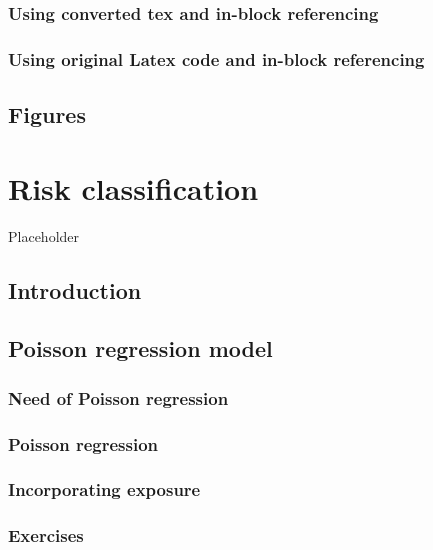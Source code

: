 \documentclass[]{book}
\theoremstyle{definition}
\theoremstyle{definition}
\theoremstyle{definition}
\theoremstyle{remark}
\begin{document}
\subsection{Using converted tex and in-block
referencing}\label{using-converted-tex-and-in-block-referencing}

\subsection{Using original Latex code and in-block
referencing}\label{using-original-latex-code-and-in-block-referencing}

\section{Figures}\label{S:Referencing-figures}

\chapter{Risk classification}\label{risk-classification}

Placeholder

\section{Introduction}\label{introduction}

\section{Poisson regression model}\label{poisson-regression-model}

\subsection{Need of Poisson regression}\label{S:Need.Poi.reg}

\subsection{Poisson regression}\label{poisson-regression}

\subsection{Incorporating exposure}\label{incorporating-exposure}

\subsection{Exercises}\label{exercises}
\end{document}
